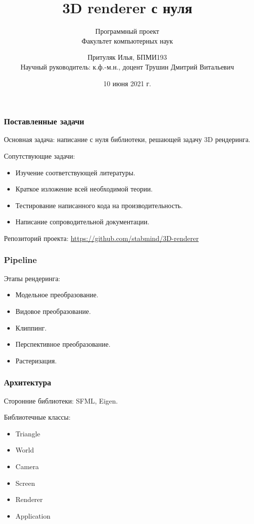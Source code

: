 \documentclass{beamer}
\title[Заголовок]{3D renderer с нуля}
\subtitle{Программный проект \\ Факультет компьютерных наук}
\author[Притуляк Илья]{Притуляк Илья, БПМИ193 \texorpdfstring{\\ \scriptsize Научный руководитель: к.ф.-м.н., доцент Трушин Дмитрий Витальевич}{Lg}}
\institute[Высшая школа экономики]{Национальный исследовательский университет \\ «Высшая школа экономики» (Москва)}
\date{10 июня 2021 г.}
\begin{document}

\frame[plain]{\titlepage}	%

\begin{frame}
\frametitle{Поставленные задачи}

Основная задача: написание с нуля библиотеки, решающей задачу 3D рендеринга. \pause

Сопутствующие задачи:
\begin{itemize}
	\item Изучение соответствующей литературы. \pause
	\item Краткое изложение всей необходимой теории. \pause
	\item Тестирование написанного кода на производительность. \pause
	\item Написание сопроводительной документации. \pause
\end{itemize}

Репозиторий проекта: \url{https://github.com/stabmind/3D-renderer}

\end{frame}

\begin{frame}
\frametitle{Pipeline}

Этапы рендеринга:
\begin{itemize}
	\item Модельное преобразование. \pause
	\item Видовое преобразование. \pause
	\item Клиппинг. \pause
	\item Перспективное преобразование. \pause
	\item Растеризация.
\end{itemize}
\end{frame}

\begin{frame}
\frametitle{Архитектура}

Сторонние библиотеки: SFML, Eigen. \pause

Библиотечные классы:
\begin{itemize}
	\item Triangle \pause
 	\item World \pause
 	\item Camera \pause
 	\item Screen \pause
 	\item Renderer \pause
 	\item Application
\end{itemize}
\end{frame}
\end{document}
